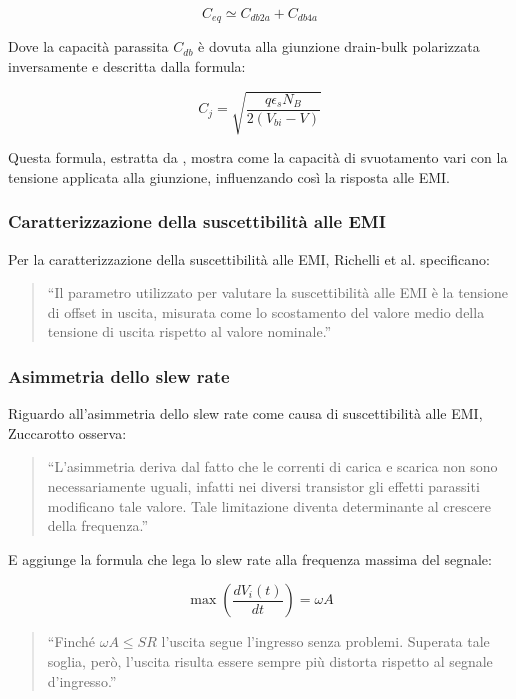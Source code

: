 \begin{equation}
C_{eq} \simeq C_{db2a} + C_{db4a}
\end{equation}

Dove la capacità parassita $C_{db}$ è dovuta alla giunzione drain-bulk polarizzata inversamente e descritta dalla formula:

\begin{equation}
C_j = \sqrt{\frac{q\epsilon_s N_B}{2(V_{bi} - V)}}
\end{equation}

Questa formula, estratta da \cite{tesi}, mostra come la capacità di svuotamento vari con la tensione applicata alla giunzione, influenzando così la risposta alle EMI.

\subsubsection{Caratterizzazione della suscettibilità alle EMI}

Per la caratterizzazione della suscettibilità alle EMI, Richelli et al. \cite{Measurements_of_EMI_susceptibility_of_precision_voltage_references} specificano:

\begin{quote}
``Il parametro utilizzato per valutare la suscettibilità alle EMI è la tensione di offset in uscita, misurata come lo scostamento del valore medio della tensione di uscita rispetto al valore nominale.''
\end{quote}

\subsubsection{Asimmetria dello slew rate}

Riguardo all'asimmetria dello slew rate come causa di suscettibilità alle EMI, Zuccarotto \cite{tesi} osserva:

\begin{quote}
``L'asimmetria deriva dal fatto che le correnti di carica e scarica non sono necessariamente uguali, infatti nei diversi transistor gli effetti parassiti modificano tale valore. Tale limitazione diventa determinante al crescere della frequenza.''
\end{quote}

E aggiunge la formula che lega lo slew rate alla frequenza massima del segnale:

\begin{equation}
\max\left(\frac{dV_i(t)}{dt}\right) = \omega A
\end{equation}

\begin{quote}
``Finché $\omega A \leq SR$ l'uscita segue l'ingresso senza problemi. Superata tale soglia, però, l'uscita risulta essere sempre più distorta rispetto al segnale d'ingresso.''
\end{quote}